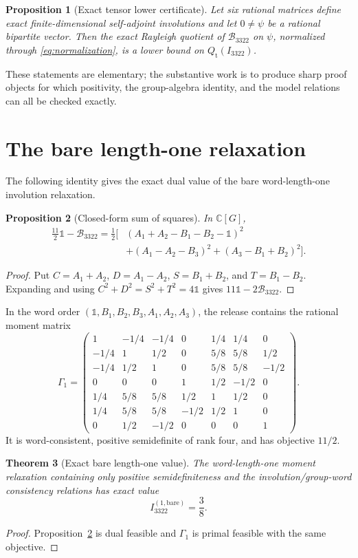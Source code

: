 \documentclass[11pt]{article}
\newtheorem{theorem}{Theorem}[section]
\newtheorem{proposition}[theorem]{Proposition}
\newcommand{\1}{\mathbb{1}}
\newcommand{\Bop}{\mathcal{B}_{3322}}
\newcommand{\Qt}{Q_{\mathrm t}}
\newcommand{\C}{\mathbb{C}}
\begin{document}
\begin{proposition}[Exact tensor lower certificate]\label{prop:lower}
Let six rational matrices define exact finite-dimensional self-adjoint involutions and let $0\ne\psi$ be a rational bipartite vector.  Then the exact Rayleigh quotient of $\Bop$ on $\psi$, normalized through \eqref{eq:normalization}, is a lower bound on $\Qt(I_{3322})$.
\end{proposition}

These statements are elementary; the substantive work is to produce sharp proof objects for which positivity, the group-algebra identity, and the model relations can all be checked exactly.

\section{The bare length-one relaxation}\label{sec:level1}
The following identity gives the exact dual value of the bare word-length-one involution relaxation.

\begin{proposition}[Closed-form sum of squares]\label{prop:sos}
In $\C[G]$,
\begin{align}\label{eq:sos}
\frac{11}{2}\1-\Bop=\frac12\big[&(A_1+A_2-B_1-B_2-\1)^2\nonumber\\
&+(A_1-A_2-B_3)^2+(A_3-B_1+B_2)^2\big].
\end{align}
\end{proposition}
\begin{proof}
Put $C=A_1+A_2$, $D=A_1-A_2$, $S=B_1+B_2$, and $T=B_1-B_2$.  Expanding and using $C^2+D^2=S^2+T^2=4\1$ gives $11\1-2\Bop$.
\end{proof}

In the word order $(\1,B_1,B_2,B_3,A_1,A_2,A_3)$, the release contains the rational moment matrix
\[
\Gamma_1=\begin{pmatrix}
1&-1/4&-1/4&0&1/4&1/4&0\\
-1/4&1&1/2&0&5/8&5/8&1/2\\
-1/4&1/2&1&0&5/8&5/8&-1/2\\
0&0&0&1&1/2&-1/2&0\\
1/4&5/8&5/8&1/2&1&1/2&0\\
1/4&5/8&5/8&-1/2&1/2&1&0\\
0&1/2&-1/2&0&0&0&1
\end{pmatrix}.
\]
It is word-consistent, positive semidefinite of rank four, and has objective $11/2$.

\begin{theorem}[Exact bare length-one value]\label{thm:l1}
The word-length-one moment relaxation containing only positive semidefiniteness and the involution/group-word consistency relations has exact value
\[
I_{3322}^{(1,\mathrm{bare})}=\frac38.
\]
\end{theorem}
\begin{proof}
Proposition~\ref{prop:sos} is dual feasible and $\Gamma_1$ is primal feasible with the same objective.
\end{proof}
\end{document}
